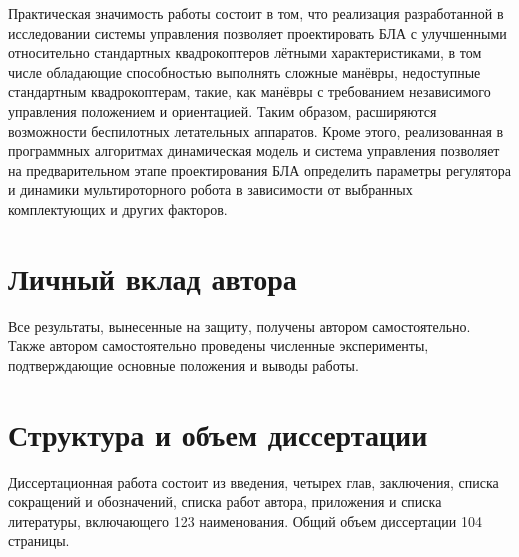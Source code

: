 Практическая значимость работы состоит в том, что
реализация разработанной в исследовании системы управления позволяет проектировать БЛА с улучшенными относительно стандартных квадрокоптеров лётными характеристиками, в том числе обладающие способностью 
выполнять сложные манёвры, недоступные стандартным квадрокоптерам, такие, как манёвры с требованием независимого управления положением и ориентацией.
Таким образом, расширяются возможности беспилотных летательных аппаратов.
Кроме этого, реализованная в программных алгоритмах динамическая модель и система управления позволяет на предварительном этапе проектирования БЛА определить параметры регулятора и динамики мультироторного робота в зависимости от выбранных комплектующих и других факторов.

\section{Личный вклад автора}
Все результаты, вынесенные на защиту, получены автором самостоятельно.
Также автором самостоятельно проведены численные эксперименты,
подтверждающие основные положения и выводы работы. 

\section{Структура и объем диссертации}
Диссертационная работа состоит из введения, четырех глав, заключения,
списка сокращений и обозначений, списка работ автора, приложения и списка литературы,
включающего 123 наименования.
Общий объем диссертации 104 страницы.












